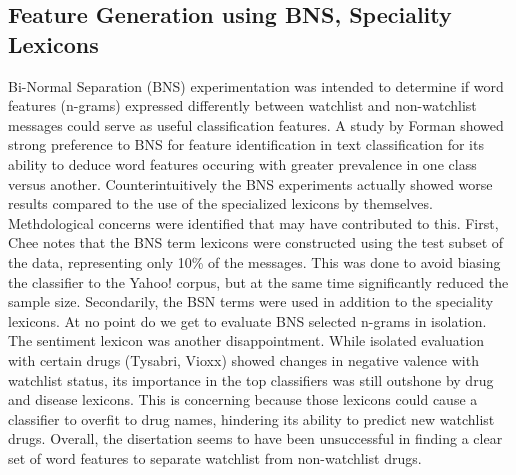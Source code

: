 \documentclass[twoside,11pt]{article}
\begin{document}
\subsection{Feature Generation using BNS, Speciality Lexicons}
Bi-Normal Separation (BNS) experimentation was intended to determine if word features (n-grams) expressed differently between watchlist and non-watchlist messages could serve as useful classification features. A study by Forman \citep{Forman} showed strong preference to BNS for feature identification in text classification for its ability to deduce word features occuring with greater prevalence in one class versus another. Counterintuitively the BNS experiments actually showed worse results compared to the use of the specialized lexicons by themselves.
Methdological concerns were identified that may have contributed to this. First, Chee notes that the BNS term lexicons were constructed using the test subset of the data, representing only 10\% of the messages. This was done to avoid biasing the classifier to the Yahoo! corpus, but at the same time significantly reduced the sample size. Secondarily, the BSN terms were used in addition to the speciality lexicons. At no point do we get to evaluate BNS selected n-grams in isolation.
The sentiment lexicon was another disappointment. While isolated evaluation with certain drugs (Tysabri, Vioxx) showed changes in negative valence with watchlist status, its importance in the top classifiers was still outshone by drug and disease lexicons. This is concerning because those lexicons could cause a classifier to overfit to drug names, hindering its ability to predict new watchlist drugs. Overall, the disertation seems to have been unsuccessful in finding a clear set of word features to separate watchlist from non-watchlist drugs.
\end{document}
